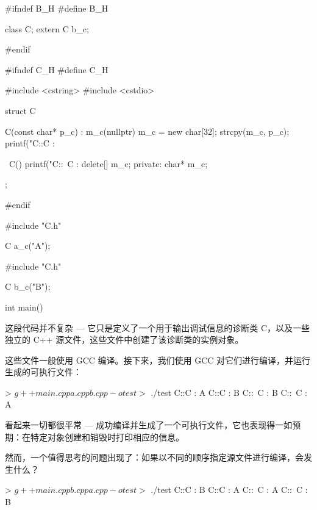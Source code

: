 
\begin{cpp}
#ifndef B_H
#define B_H

class C;
extern C b_c;

#endif
\end{cpp}


\begin{cpp}
#ifndef C_H
#define C_H

#include <cstring>
#include <cstdio>

struct C {
  C(const char* p_c) : m_c(nullptr) {
    m_c = new char[32];
    strcpy(m_c, p_c);
    printf("C::C : %
  }

  ~C() {
    printf("C::~C : %
    delete[] m_c;
  }
private:
  char* m_c;
};

#endif
\end{cpp}


\begin{cpp}
#include "C.h"

C a_c("A");
\end{cpp}


\begin{cpp}
#include "C.h"

C b_c("B");
\end{cpp}


\begin{cpp}
int main()
{ 
}
\end{cpp}

这段代码并不复杂 --- 它只是定义了一个用于输出调试信息的诊断类 C，以及一些独立的 C++ 源文件，这些文件中创建了该诊断类的实例对象。

这些文件一般使用 GCC 编译。接下来，我们使用 GCC 对它们进行编译，并运行生成的可执行文件：

\begin{shell}
> $ g++ main.cpp a.cpp b.cpp -o test
> $ ./test
C::C : A
C::C : B
C::~C : B
C::~C : A
\end{shell}

看起来一切都很平常 --- 成功编译并生成了一个可执行文件，它也表现得一如预期：在特定对象创建和销毁时打印相应的信息。

然而，一个值得思考的问题出现了：如果以不同的顺序指定源文件进行编译，会发生什么？

\begin{shell}
> $ g++ main.cpp b.cpp a.cpp -o test
> $ ./test
C::C : B
C::C : A
C::~C : A
C::~C : B
\end{shell}

